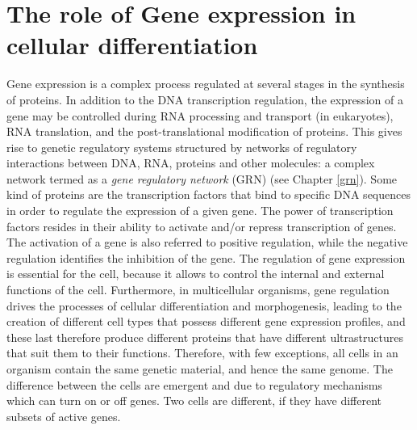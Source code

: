 \section{The role of Gene expression in cellular differentiation}
Gene expression is a complex process regulated at several stages in the synthesis of proteins. In addition to the DNA transcription regulation, the expression of a gene may be controlled during RNA processing and transport (in eukaryotes), RNA translation, and the post-translational modification of proteins. This gives rise to genetic regulatory systems structured by networks of regulatory interactions between DNA, RNA, proteins and other molecules: a complex network termed as a \emph{gene regulatory
network} (GRN) (see Chapter \ref{grn}). Some kind of proteins are the transcription factors that bind to specific DNA sequences in order to regulate the
expression of a given gene. The power of transcription factors resides in their ability to activate and/or repress transcription of genes. The activation of
a gene is also referred to positive regulation, while the negative regulation
identifies the inhibition of the gene.
The regulation of gene expression is essential for the cell, because it
allows to control the internal and external functions of the cell. Furthermore,
in multicellular organisms, gene regulation drives the processes of cellular
differentiation and morphogenesis, leading to the creation of different cell
types that possess different gene expression profiles, and these last therefore
produce different proteins that have different ultrastructures that suit them
to their functions. Therefore, with few exceptions, all cells in an
organism contain the same genetic material, and hence the same genome. The difference between the cells are emergent and due to regulatory mechanisms which can turn on or off genes. Two cells are different, if they have different subsets of active genes.



